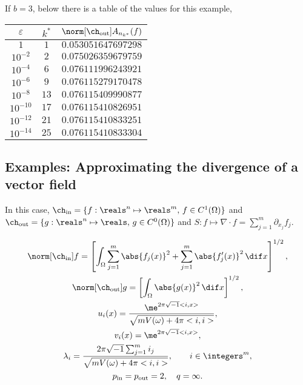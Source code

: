 \documentclass[final]{elsarticle}
\newcommand{\chin}{\ch_{\text{\rm{in}}}}
\newcommand{\chout}{\ch_{\text{\rm{out}}}}
\newcommand{\pin}{p_{\text{\rm{in}}}}
\newcommand{\pout}{p_{\text{\rm{out}}}}
\theoremstyle{definition}
\theoremstyle{remark}
\begin{document}
If $b=3$, below there is a table of the values for this example,
\begin{center}
\begin{tabular}{|c|c|c|}
  \hline
  $\varepsilon$ & $k^*$ & $\norm[\chout]{A_{n_{k^*}}(f)}$ \\
  \hline
  $1$ & $1$ & $0.053051647697298$ \\
  $10^{-2}$ & $2$ & $0.075026359679759$ \\
  $10^{-4}$ & $6$ & $0.076111996243921$ \\
  $10^{-6}$ & $9$ & $0.076115279170478$ \\
  $10^{-8}$ & $13$ & $0.076115409990877$ \\
  $10^{-10}$ & $17$ & $0.076115410826951$ \\
  $10^{-12}$ & $21$ & $0.076115410833251$ \\
  $10^{-14}$ & $25$ & $0.076115410833304$ \\
  \hline
\end{tabular}
\end{center}

\subsection{Examples: Approximating the divergence of a vector field}

In this case, $\chin=\{f:\reals^n\mapsto\reals^m,\, f\in C^1(\Omega)\}$ and $\chout=\{g:\reals^n\mapsto\reals,\, g\in C^0(\Omega)\}$ and $S: f\mapsto \nabla\cdot f=\sum_{j=1}^{m}\partial_{x_j}f_j$.

\begin{gather*}
\norm[\chin]{f} =\left[\int_\Omega \sum_{j=1}^{m}\abs{f_j(x)}^2+\sum_{j=1}^{m}\abs{f'_j(x)}^2 \, \dif x \right]^{1/2},\\
\norm[\chout]{g} = \left[\int_\Omega \abs{g(x)}^2 \, \dif x \right]^{1/2}, \\
u_{i}(x) = \frac{\me^{2 \pi \sqrt{-1} <i,x>}}{\sqrt{mV(\omega)+4\pi<i,i>}}, \\
v_i(x) = \me^{2 \pi \sqrt{-1} <i,x>},\\
 \lambda_i=\frac{2\pi\sqrt{-1}\sum_{j=1}^{m}i_j}{\sqrt{mV(\omega)+4\pi<i,i>}}, \qquad i \in \integers^m,\\
\pin=\pout=2,\quad q=\infty.
\end{gather*}







\end{document}
